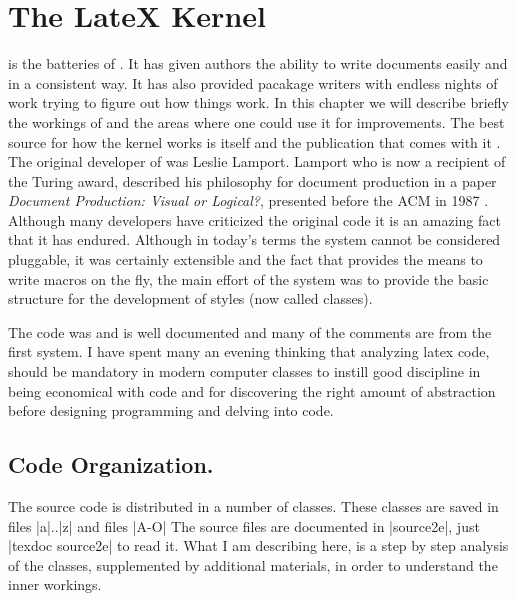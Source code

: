 
\chapter{The LateX Kernel}


\latex is the batteries of \tex. It has given authors the ability to write documents easily and in a consistent way. It has also provided pacakage writers with endless nights of work trying to figure out how things work. In this chapter we will describe briefly the workings of \latex and the areas where one could use it for improvements. The best source for how the \latex kernel works is \latex itself and the publication that comes with it .
The original developer of \latex was Leslie Lamport. Lamport who is now a recipient of the Turing award, described his philosophy for document production in a paper \textit{Document Production: Visual or Logical?}, presented before the ACM in 1987 \cite{lamport1987}. Although many developers have criticized the original code it is an amazing fact that it has endured. Although in today’s terms the system cannot be considered pluggable, it was
certainly extensible and the fact that \tex provides the means to write macros on the fly, the main effort
of the \latexe system was to provide the basic structure for the development of styles (now called classes).

The code was and is well documented and many of the comments are from the first system. I have spent many an
evening thinking that analyzing latex code, should be mandatory in modern computer classes to instill
good discipline in being economical with code and for discovering the right amount of abstraction before designing programming and delving into code.

\section{Code Organization.} 

The \latex source code is distributed in a number of classes. These classes are saved in files |a|..|z| and files |A-O| The source files are documented in |source2e|, just |texdoc source2e| to read it. What I am describing here, is a step by step analysis of the classes, supplemented by additional materials, in order to understand the inner workings. 

